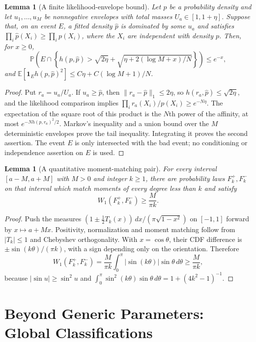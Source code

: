 \documentclass[11pt,a4paper]{article}
\newtheorem{lemma}[theorem]{Lemma}
\theoremstyle{definition}
\theoremstyle{remark}
\numberwithin{equation}{section}
\newcommand{\collectedpart}[1]{%
 \clearpage\part{#1}%
 \setcounter{section}{0}%
 \renewcommand{\thesection}{\Roman{part}.\arabic{section}}%
 \renewcommand{\theHsection}{p\arabic{part}.s\arabic{section}}%
 \renewcommand{\arraystretch}{1}%
}
\begin{document}
\begin{lemma}[A finite likelihood-envelope bound]\label{p6:gf:envelope}
Let $p$ be a probability density and let $u_1,\ldots,u_M$ be
nonnegative envelopes with total masses $U_a\in[1,1+\eta]$.
Suppose that, on an event $E$, a fitted density $\widehat p$ is
dominated by some $u_a$ and satisfies
$\prod_i\widehat p(X_i)\ge\prod_i p(X_i)$, where the $X_i$
are independent with density $p$.  Then, for $x\ge0$,
\[
 \mathbb P\left(E\cap\left\{
 h(p,\widehat p)>\sqrt{2\eta}
       +\sqrt{\eta+2(\log M+x)/N}\right\}\right)\le e^{-x},
\]
and
$\mathbb E[\mathbf1_Eh(p,\widehat p)^2]
 \le C\eta+C(\log M+1)/N$.
\end{lemma}
\begin{proof}
Put $r_a=u_a/U_a$.  If $u_a\ge\widehat p$, then
$\|r_a-\widehat p\|_1\le2\eta$, so
$h(r_a,\widehat p)\le\sqrt{2\eta}$, and the likelihood comparison
implies $\prod_i r_a(X_i)/p(X_i)\ge e^{-N\eta}$.
The expectation of the square root of this product is the $N$th
power of the affinity, at most $e^{-Nh(p,r_a)^2/2}$.
Markov's inequality and a union bound over the $M$ deterministic
envelopes prove the tail inequality.  Integrating it proves the
second assertion.  The event $E$ is only intersected with the bad
event; no conditioning or independence assertion on $E$ is used.
\end{proof}

\begin{lemma}[A quantitative moment-matching pair]\label{p6:gf:witness}
For every interval $[a-M,a+M]$ with $M>0$ and integer $k\ge1$,
there are probability laws $F_k^+,F_k^-$ on that interval which
match moments of every degree less than $k$ and satisfy
\[
                         W_1(F_k^+,F_k^-)\ge\frac M{\pi k}.
\]
\end{lemma}
\begin{proof}
Push the measures
$(1\pm\tfrac12T_k(x))\,dx/(\pi\sqrt{1-x^2})$ on $[-1,1]$
forward by $x\mapsto a+Mx$.  Positivity, normalization and moment
matching follow from $|T_k|\le1$ and Chebyshev orthogonality.
With $x=\cos\theta$, their CDF difference is
$\pm\sin(k\theta)/(\pi k)$, with a sign depending only on the
orientation.  Therefore
\[
 W_1(F_k^+,F_k^-)=\frac M{\pi k}
         \int_0^\pi|\sin(k\theta)|\sin\theta\,d\theta
         \ge\frac M{\pi k},
\]
because $|\sin u|\ge\sin^2u$ and
$\int_0^\pi\sin^2(k\theta)\sin\theta\,d\theta
 =1+(4k^2-1)^{-1}$.
\end{proof}


\collectedpart{Beyond Generic Parameters: Global Classifications}\label{part:7}
\end{document}
